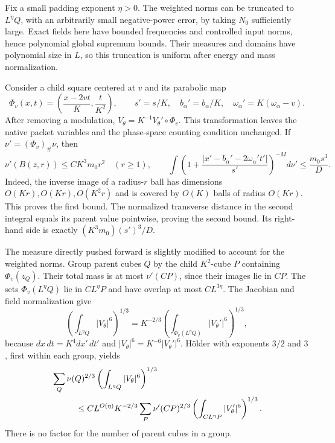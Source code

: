 Fix a small padding exponent $\eta>0$.  The weighted norms can be
truncated to $L^\eta Q$, with an arbitrarily small negative-power error,
by taking $N_0$ sufficiently large.  Exact fields here have bounded
frequencies and controlled input norms, hence polynomial global
supremum bounds.  Their measures and domains have polynomial size in
$L$, so this truncation is uniform after energy and mass normalization.

Consider a child square centered at $v$ and its parabolic map
\begin{equation}\label{eq:sparse-child-map}
 \Phi_v(x,t)=\left(\frac{x-2vt}{K},\frac{t}{K^2}\right),
 \qquad s'=s/K,\quad b_\alpha'=b_\alpha/K,\quad
       \omega_\alpha'=K(\omega_\alpha-v).
\end{equation}
After removing a modulation, $V_\theta=K^{-1}V_\theta'\circ\Phi_v$.
This transformation leaves the native packet variables and the
phase-space counting condition unchanged.  If
$\nu'=(\Phi_v)_\#\nu$, then
\begin{equation}\label{eq:sparse-direct-transport}
 \nu'(B(z,r))\le C K^3m_0r^2\quad(r\ge1),
 \qquad
 \int\left(1+\frac{|x'-b_\alpha'-2\omega_\alpha't'|}{s'}\right)^{-M}
            d\nu'
 \le \frac{m_0s^3}{D}.
\end{equation}
Indeed, the inverse image of a radius-$r$ ball has dimensions
$O(Kr),O(Kr),O(K^2r)$ and is covered by $O(K)$ balls of radius $O(Kr)$.
This proves the first bound.  The normalized transverse distance in
the second integral equals its parent value pointwise, proving the
second bound.  Its right-hand side is exactly
$(K^3m_0)(s')^3/D$.

The measure directly pushed forward is slightly modified to account
for the weighted norms.  Group parent cubes $Q$ by the child
$K^2$-cube $P$ containing $\Phi_v(z_Q)$.  Their total mass is at most
$\nu'(CP)$, since their images lie in $CP$.  The sets
$\Phi_v(L^\eta Q)$ lie in $CL^\eta P$ and have overlap at most
$CL^{3\eta}$.  The Jacobian and field normalization give
\begin{equation}\label{eq:sparse-jacobian}
 \left(\int_{L^\eta Q}|V_\theta|^6\right)^{1/3}
   =K^{-2/3}
       \left(\int_{\Phi_v(L^\eta Q)}|V_\theta'|^6\right)^{1/3},
\end{equation}
because $dx\,dt=K^4dx'\,dt'$ and $|V_\theta|^6=K^{-6}|V_\theta'|^6$.
H\"older with exponents $3/2$ and $3$, first within each group, yields
\begin{align}
 &\sum_Q\nu(Q)^{2/3}
      \left(\int_{L^\eta Q}|V_\theta|^6\right)^{1/3}
       \notag\\
 &\hspace{1cm}\le C L^{O(\eta)}K^{-2/3}
       \sum_P\nu'(CP)^{2/3}
          \left(\int_{CL^\eta P}|V_\theta'|^6\right)^{1/3}.
          \label{eq:sparse-group-holder}
\end{align}
There is no factor for the number of parent cubes in a group.

